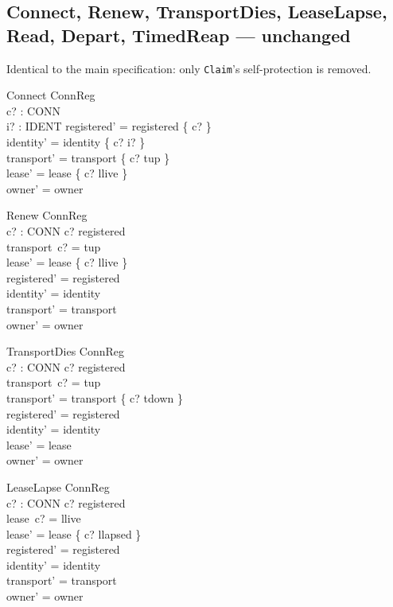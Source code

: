\documentclass[a4paper,10pt,fleqn]{article}
\begin{document}
\subsection{Connect, Renew, TransportDies, LeaseLapse, Read, Depart, TimedReap --- unchanged}

Identical to the main specification: only \texttt{Claim}'s
self-protection is removed.

\begin{schema}{Connect}
  \Delta ConnReg \\
  c? : CONN \\
  i? : IDENT
\where
  registered' = registered \cup \{ c? \} \\
  identity' = identity \oplus \{ c? \mapsto i? \} \\
  transport' = transport \oplus \{ c? \mapsto tup \} \\
  lease' = lease \oplus \{ c? \mapsto llive \} \\
  owner' = owner
\end{schema}

\begin{schema}{Renew}
  \Delta ConnReg \\
  c? : CONN
\where
  c? \in registered \\
  transport~c? = tup \\
  lease' = lease \oplus \{ c? \mapsto llive \} \\
  registered' = registered \\
  identity' = identity \\
  transport' = transport \\
  owner' = owner
\end{schema}

\begin{schema}{TransportDies}
  \Delta ConnReg \\
  c? : CONN
\where
  c? \in registered \\
  transport~c? = tup \\
  transport' = transport \oplus \{ c? \mapsto tdown \} \\
  registered' = registered \\
  identity' = identity \\
  lease' = lease \\
  owner' = owner
\end{schema}

\begin{schema}{LeaseLapse}
  \Delta ConnReg \\
  c? : CONN
\where
  c? \in registered \\
  lease~c? = llive \\
  lease' = lease \oplus \{ c? \mapsto llapsed \} \\
  registered' = registered \\
  identity' = identity \\
  transport' = transport \\
  owner' = owner
\end{schema}
\end{document}
